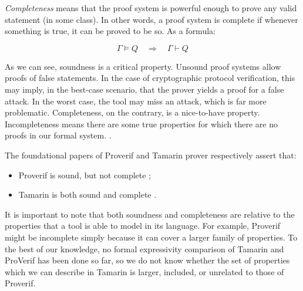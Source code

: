 \textit{Completeness} means that the proof system is powerful enough to prove any valid statement (in some class). In other words, a proof system is complete if whenever something is true, it can be proved to be so. As a formula:

\begin{equation}
    \Gamma \models Q \quad \Longrightarrow \quad \Gamma \vdash Q
\end{equation}

As we can see, soundness is a critical property. Unsound proof systems allow proofs of false statements. In the case of cryptographic protocol verification, this may imply, in the best-case scenario, that the prover yields a proof for a false attack. In the worst case, the tool may miss an attack, which is far more problematic.
Completeness, on the contrary, is a nice-to-have property. Incompleteness means there are some true properties for which there are no proofs in our formal system. \cite{slides_on_sound_complete}.

The foundational papers of Proverif and Tamarin prover respectively assert that:
\begin{itemize}
    \item Proverif is sound, but not complete \cite{ProverifManual};
    \item Tamarin is both sound and complete \cite{TamarinFoundations, TamarinFoundationsExtended, xor_tamarin}.
\end{itemize}

It is important to note that both soundness and completeness are relative to the properties that a tool is able to model in its language. For example, Proverif might be incomplete simply because it can cover a larger family of properties. To the best of our knowledge, no formal expressivity comparison of Tamarin and ProVerif has been done so far, so we do not know whether the set of properties which we can describe in Tamarin is larger, included, or unrelated to those of Proverif.